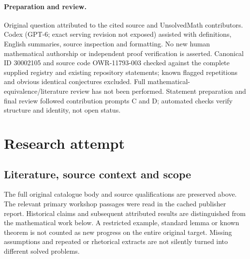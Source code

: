 \documentclass[11pt]{article}
\begin{document}
\paragraph{Preparation and review.}
Original question attributed to the cited source and UnsolvedMath contributors. Codex (GPT-6; exact serving revision not exposed) assisted with definitions, English summaries, source inspection and formatting. No new human mathematical authorship or independent proof verification is asserted. Canonical ID 30002105 and source code OWR-11793-003 checked against the complete supplied registry and existing repository statements; known flagged repetitions and obvious identical conjectures excluded. Full mathematical-equivalence/literature review has not been performed. Statement preparation and final review followed contribution prompts C and D; automated checks verify structure and identity, not open status.
\label{end:30002105}

\section{Research attempt}
\subsection{Literature, source context and scope}
The full original catalogue body and source qualifications are preserved above. The relevant primary workshop passages were read in the cached publisher report. Historical claims and subsequent attributed results are distinguished from the mathematical work below. A restricted example, standard lemma or known theorem is not counted as new progress on the entire original target. Missing assumptions and repeated or rhetorical extracts are not silently turned into different solved problems.
\end{document}
